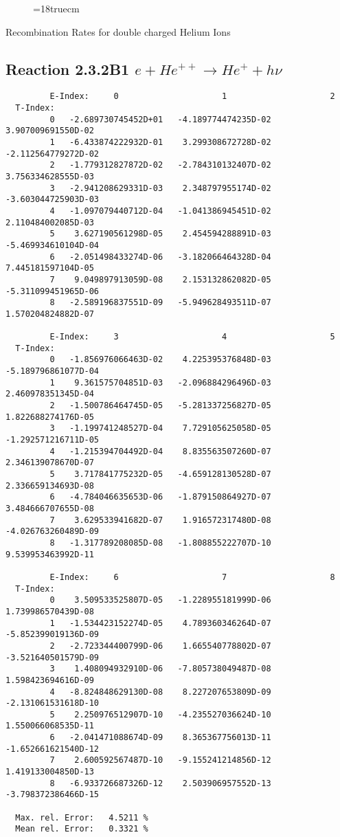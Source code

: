\begin{figure} \label{2.3.2B0}
\epsfxsize=18truecm
\end{figure}
\newpage
  Recombination Rates for double charged Helium Ions

\subsection{
Reaction 2.3.2B1  $e + He^{++} \rightarrow He^+ + h\nu$
}


\begin{verbatim}
         E-Index:     0                     1                     2
  T-Index:
         0   -2.689730745452D+01   -4.189774474235D-02    3.907009691550D-02
         1   -6.433874222932D-01    3.299308672728D-02   -2.112564779272D-02
         2   -1.779312827872D-02   -2.784310132407D-02    3.756334628555D-03
         3   -2.941208629331D-03    2.348797955174D-02   -3.603044725903D-03
         4   -1.097079440712D-04   -1.041386945451D-02    2.110484002085D-03
         5    3.627190561298D-05    2.454594288891D-03   -5.469934610104D-04
         6   -2.051498433274D-06   -3.182066464328D-04    7.445181597104D-05
         7    9.049897913059D-08    2.153132862082D-05   -5.311099451965D-06
         8   -2.589196837551D-09   -5.949628493511D-07    1.570204824882D-07

         E-Index:     3                     4                     5
  T-Index:
         0   -1.856976066463D-02    4.225395376848D-03   -5.189796861077D-04
         1    9.361575704851D-03   -2.096884296496D-03    2.460978351345D-04
         2   -1.500786464745D-05   -5.281337256827D-05    1.822688274176D-05
         3   -1.199741248527D-04    7.729105625058D-05   -1.292571216711D-05
         4   -1.215394704492D-04    8.835563507260D-07    2.346139078670D-07
         5    3.717841775232D-05   -4.659128130528D-07    2.336659134693D-08
         6   -4.784046635653D-06   -1.879150864927D-07    3.484666707655D-08
         7    3.629533941682D-07    1.916572317480D-08   -4.026763260489D-09
         8   -1.317789208085D-08   -1.808855222707D-10    9.539953463992D-11

         E-Index:     6                     7                     8
  T-Index:
         0    3.509533525807D-05   -1.228955181999D-06    1.739986570439D-08
         1   -1.534423152274D-05    4.789360346264D-07   -5.852399019136D-09
         2   -2.723344400799D-06    1.665540778802D-07   -3.521640501579D-09
         3    1.408094932910D-06   -7.805738049487D-08    1.598423694616D-09
         4   -8.824848629130D-08    8.227207653809D-09   -2.131061531618D-10
         5    2.250976512907D-10   -4.235527036624D-10    1.550066068535D-11
         6   -2.041471088674D-09    8.365367756013D-11   -1.652661621540D-12
         7    2.600592567487D-10   -9.155241214856D-12    1.419133004850D-13
         8   -6.933726687326D-12    2.503906957552D-13   -3.798372386466D-15

  Max. rel. Error:   4.5211 %
  Mean rel. Error:   0.3321 %

\end{verbatim}
